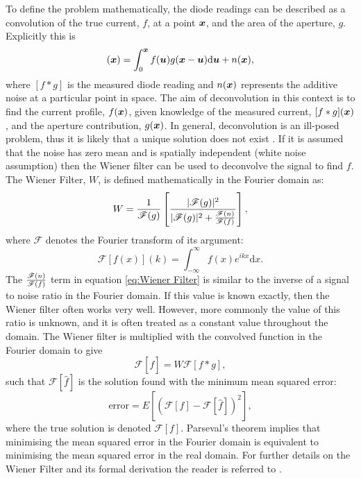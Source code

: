 To define the problem mathematically, the diode readings can be described as a convolution of the true current, $f$, at a point $\boldsymbol{x}$, and the area of the aperture, $g$.
Explicitly this is
\begin{equation}
[f*g](\bs{x}) = \int_0^{\bs{x}} f(\bs{u})g(\bs{x}-\bs{u})\mathrm{d}\bs{u} + n(\bs{x}),
\label{eq:Convolution equation with noise}
\end{equation}
where $[f*g]$ is the measured diode reading and $n(\boldsymbol{x})$ represents the additive noise at a particular point in space.
The aim of deconvolution in this context is to find the current profile, $f(\boldsymbol{x})$, given knowledge of the measured current, $[f*g](\boldsymbol{x})$, and the aperture contribution, $g(\boldsymbol{x})$.
In general, deconvolution is an ill-posed problem, thus it is likely that a unique solution does not exist \cite{wolfram2016Deconvolution}.
If it is assumed that the noise has zero mean and is spatially independent (white noise assumption) then the Wiener filter \cite{wiener1949extrapolation} can be used to deconvolve the signal to find $f$.
The Wiener Filter, $W$, is defined mathematically in the Fourier domain as:
\begin{equation}
W = \frac{1}{\mathscr{F}(g)}\left[\frac{|\mathscr{F}(g)|^2}{|\mathscr{F}(g)|^2 + \frac{\mathscr{F}(n)}{\mathscr{F}(f)}}\right],
\label{eq:Wiener Filter}
\end{equation}
where $\mathscr{F}$ denotes the Fourier transform of its argument:
\begin{equation}
\mathscr{F}[f(x)](k) = \int_{-\infty}^{\infty} \! f(x) e^{ikx} \mathrm{d}x.
\label{eq:Classic Fourier Transform}
\end{equation}
The $\frac{\mathscr{F}(n)}{\mathscr{F}(f)}$ term in equation \ref{eq:Wiener Filter} is similar to the inverse of a signal to noise ratio in the Fourier domain.
If this value is known exactly, then the Wiener filter often works very well.
However, more commonly the value of this ratio is unknown, and it is often treated as a constant value throughout the domain.
\newline
The Wiener filter is multiplied with the convolved function in the Fourier domain to give
\begin{equation}
\mathscr{F}[\widehat{f}] = W \mathscr{F}[f*g],
\label{eqwienapp}
\end{equation}
such that $\mathscr{F}[\widehat{f}]$ is the solution found with the minimum mean squared error:
\begin{equation}
\text{error} = E\left[ \left(\mathscr{F}[f]-\mathscr{F}[\widehat{f}]\right)^2\right],
\label{eqerr}
\end{equation}
where the true solution is denoted $\mathscr{F}[f]$.
Parseval's theorem implies that minimising the mean squared error in the Fourier domain is equivalent to minimising the mean squared error in the real domain. For further details on the Wiener Filter and its formal derivation the reader is referred to \cite{gon1992}.

